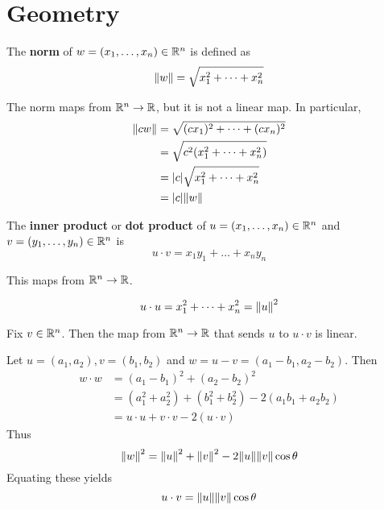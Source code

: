 \documentclass{article}
\begin{document}
    \section{Geometry}
    \begin{definition}
      The \textbf{norm} of $w = (x_1, \ldots, x_n) \in \mathbb{R}^n$ is defined as \[
        \norm{w} = \sqrt{x_1^2 + \dots + x_n^2}
      \]
    \end{definition}
    \begin{corollary}
      The norm maps from $\mathbb{R}^n \to \mathbb{R}$, but it is not a linear map. In particular,
      \begin{align*}
        \norm{cw} &= \sqrt{(cx_1)^2 + \dots + (cx_n)^2}\\
        &= \sqrt{c^2(x_1^2 + \dots + x_n^2)}\\
        &= \abs{c}\sqrt{x_1^2 + \dots +x_n^2}\\
        &= \abs{c}\norm{w}\\
      \end{align*}
    \end{corollary}
    \begin{definition}
      The \textbf{inner product} or \textbf{dot product} of $u = (x_1, \ldots, x_n) \in \mathbb{R}^n$ and $v = (y_1, \ldots, y_n) \in \mathbb{R}^n$ is \[
        u \cdot v = x_1y_1 + \dots +x_ny_n
      \]

      This maps from $\mathbb{R}^n \to \mathbb{R}$.
    \end{definition}
    \begin{corollary}
      \[
        u \cdot u = x_1^2 + \dots +x_n^2 = \norm{u}^2
      \]
    \end{corollary}
    \begin{theorem}
      Fix $v \in \mathbb{R}^n$. Then the map from $\mathbb{R}^n \to \mathbb{R}$ that sends $u$ to $u \cdot v$ is linear.
    \end{theorem}
    \begin{remark}
      Let $u = (a_1, a_2), v = (b_1, b_2)$ and $w = u - v = (a_1 - b_1, a_2-b_2)$.
      Then
      \begin{align*}
        w \cdot w &= (a_1 - b_1)^2 + (a_2 - b_2)^2\\
        &= (a_1^2 + a_2^2) + (b_1^2 + b_2^2) - 2(a_1b_1 + a_2b_2)\\
        &= u \cdot u + v\cdot v - 2(u\cdot v)
      \end{align*}
      Thus \[
        \norm{w}^2 = \norm{u}^2 + \norm{v}^2 - 2\norm{u}\norm{v} \cos \theta
      \]
      Equating these yields \[
        u\cdot v = \norm{u}\norm{v}\cos\theta
      \]
    \end{remark}
\end{document}
